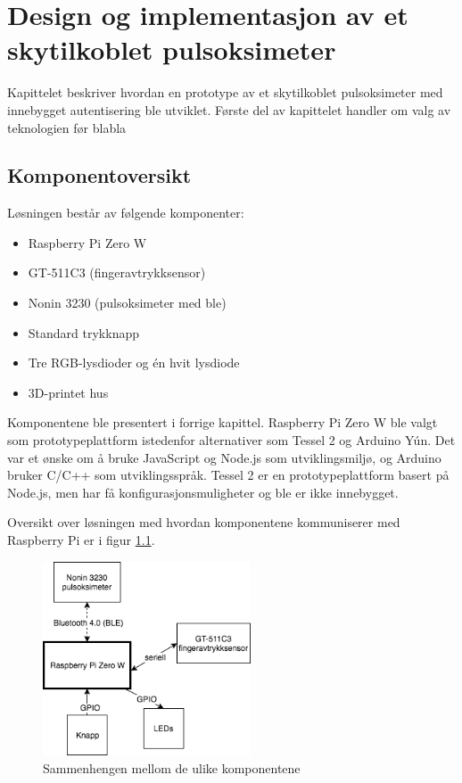 \chapter{Design og implementasjon av et skytilkoblet pulsoksimeter}
\label{ch:implementation1}

Kapittelet beskriver hvordan en prototype av et skytilkoblet pulsoksimeter med innebygget autentisering ble utviklet.
Første del av kapittelet handler om valg av teknologien før blabla

\section{Komponentoversikt}
Løsningen består av følgende komponenter:

\begin{itemize}
  \item Raspberry Pi Zero W
  \item GT-511C3 (fingeravtrykksensor)
  \item Nonin 3230 (pulsoksimeter med \gls{ble})
  \item Standard trykknapp
  \item Tre RGB-lysdioder og én hvit lysdiode
  \item 3D-printet hus
\end{itemize}

Komponentene ble presentert i forrige kapittel. Raspberry Pi Zero W ble valgt som prototypeplattform istedenfor
alternativer som Tessel 2 og Arduino Yún. Det var et ønske om å bruke JavaScript og Node.js som utviklingsmiljø, og Arduino
bruker C/C++ som utviklingsspråk. Tessel 2 er en prototypeplattform basert på Node.js, men har få konfigurasjonsmuligheter
og \gls{ble} er ikke innebygget.

Oversikt over løsningen med hvordan komponentene kommuniserer med Raspberry Pi er i figur \ref{fig:prototypeoversikt}.

\begin{figure}
\includegraphics[width=0.55\textwidth, center]{fig/prototype/oversiktlosning}
\caption{Sammenhengen mellom de ulike komponentene}
\label{fig:prototypeoversikt}
\end{figure}

